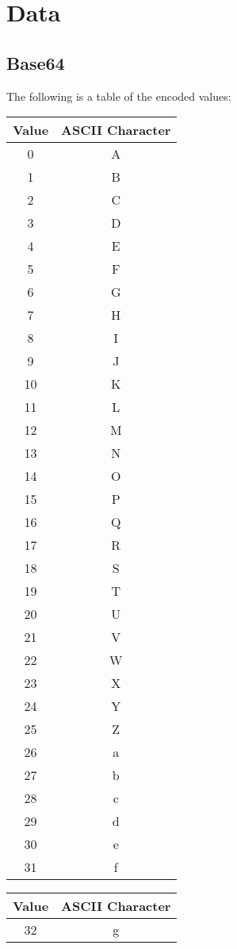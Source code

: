 \newpage
\section{Data}

\subsection{Base64}

The following is a table of the encoded values:

{\ttfamily\begin{tabular}{c c}
  \hline
  Value & ASCII Character \\
  \hline
   0 & A \\
   1 & B \\
   2 & C \\
   3 & D \\
   4 & E \\
   5 & F \\
   6 & G \\
   7 & H \\
   8 & I \\
   9 & J \\
  10 & K \\
  11 & L \\
  12 & M \\
  13 & N \\
  14 & O \\
  15 & P \\
  16 & Q \\
  17 & R \\
  18 & S \\
  19 & T \\
  20 & U \\
  21 & V \\
  22 & W \\
  23 & X \\
  24 & Y \\
  25 & Z \\
  26 & a \\
  27 & b \\
  28 & c \\
  29 & d \\
  30 & e \\
  31 & f \\
\end{tabular}
\quad
\begin{tabular}{c c}
  \hline
  Value & ASCII Character \\
  \hline
  32 & g \\

\end{tabular}}
